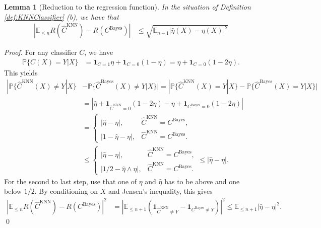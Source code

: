 \documentclass[a4paper,11pt]{article} %
\numberwithin{equation}{section}
\renewenvironment{proof}
  {{\noindent \itshape \color{gruvblue} Proof. }}{\color{gruvblue}\qed}
\theoremstyle{ndefinition}
\theoremstyle{nremark}
\theoremstyle{nplain}
\newtheorem{lem}[defi]{Lemma}
\begin{document}
\begin{lem}[Reduction to the regression function]%
  \label{lem:ReductionToTheRegressionFunction}
  In the situation of Definition \ref{def:KNNClassifier} (b), we have that 
  \begin{align*}
    | \mathbb{E}_{\le n} R(\hat C^{\text{KNN}}) - R(C^{\text{Bayes}}) | 
    & \le \sqrt{\mathbb{E}_{n + 1} | \hat \eta(X) - \eta(X) |^{2}} 
  \end{align*}
\end{lem}%
\begin{proof}%
  For any classifier \( C \), we have 
  \begin{align*}
    \mathbb{P} \{ C(X) = Y | X \} 
    & = \mathbf{1}_{C = 1} \eta + \mathbf{1}_{C = 0} ( 1 - \eta ) 
      = \eta + \mathbf{1}_{C = 0} ( 1 - 2 \eta ). 
  \end{align*}
  This yields 
  \begin{align*}
    | 
        \mathbb{P} \{ \hat C^{\text{KNN}}(X) \ne Y | X \} 
      & 
      - \mathbb{P} \{ \hat C^{\text{Bayes}}(X) \ne Y | X \} 
    | 
      = | 
            \mathbb{P} \{ \hat C^{\text{KNN}}(X) = Y | X \} 
          - \mathbb{P} \{ \hat C^{\text{Bayes}}(X) = Y | X \} 
        | 
    \\ 
    & = | 
            \hat \eta + \mathbf{1}_{\hat C^{\text{KNN}} = 0} ( 1 - 2 \hat \eta ) 
          - \eta + \mathbf{1}_{C^{\text{Bayes}} = 0} ( 1 - 2 \eta )
        |
    \\ 
    & = \begin{cases}
          | \hat \eta - \eta |, & \hat C^{\text{KNN}} = C^{\text{Bayes}}, \\ 
          | 1 - \hat \eta - \eta |, & \hat C^{\text{KNN}} = C^{\text{Bayes}}.
        \end{cases}
    \\ 
    & \le \begin{cases}
            | \hat \eta - \eta |, & \hat C^{\text{KNN}} = C^{\text{Bayes}}, \\ 
            | 1 / 2 - \hat \eta \land  \eta |,
            & \hat C^{\text{KNN}} = C^{\text{Bayes}}.
          \end{cases}
      \le | \hat \eta - \eta |.
  \end{align*}
  For the second to last step, use that one of \( \eta \) and \( \hat \eta \)
  has to be above and one below \( 1 / 2 \). 
  By conditioning on \( X \) and Jensen's inequality, this gives
  \begin{align*}
    | \mathbb{E}_{\le n} R(\hat C^{\text{KNN}}) - R(C^{\text{Bayes}}) |^{2} 
    & = | 
          \mathbb{E}_{\le n + 1} ( 
              \mathbf{1}_{\hat C^{\text{KNN}} \ne Y} 
            - \mathbf{1}_{C^{\text{Bayes}} \ne Y}
          )
        |^{2} 
      \le \mathbb{E}_{\le n + 1} | \hat \eta - \eta |^{2}.
  \end{align*}
\end{proof}%
\end{document}
